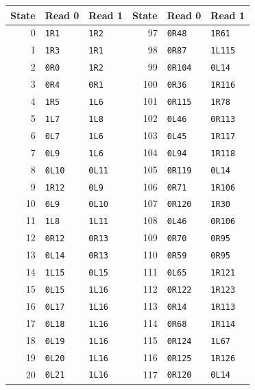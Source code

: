 \begingroup\small\setlength{\tabcolsep}{15pt}
\begin{longtable}{@{}rll@{\qquad\qquad}rll@{}}
\toprule State & Read 0 & Read 1 & State & Read 0 & Read 1\\\midrule\endhead
0 & \texttt{1R1} & \texttt{1R2} & 97 & \texttt{0R48} & \texttt{1R61}\\
1 & \texttt{1R3} & \texttt{1R1} & 98 & \texttt{0R87} & \texttt{1L115}\\
2 & \texttt{0R0} & \texttt{1R2} & 99 & \texttt{0R104} & \texttt{0L14}\\
3 & \texttt{0R4} & \texttt{0R1} & 100 & \texttt{0R36} & \texttt{1R116}\\
4 & \texttt{1R5} & \texttt{1L6} & 101 & \texttt{0R115} & \texttt{1R78}\\
5 & \texttt{1L7} & \texttt{1L8} & 102 & \texttt{0L46} & \texttt{0R113}\\
6 & \texttt{0L7} & \texttt{1L6} & 103 & \texttt{0L45} & \texttt{1R117}\\
7 & \texttt{0L9} & \texttt{1L6} & 104 & \texttt{0L94} & \texttt{1R118}\\
8 & \texttt{0L10} & \texttt{0L11} & 105 & \texttt{0R119} & \texttt{0L14}\\
9 & \texttt{1R12} & \texttt{0L9} & 106 & \texttt{0R71} & \texttt{1R106}\\
10 & \texttt{0L9} & \texttt{0L10} & 107 & \texttt{0R120} & \texttt{1R30}\\
11 & \texttt{1L8} & \texttt{1L11} & 108 & \texttt{0L46} & \texttt{0R106}\\
12 & \texttt{0R12} & \texttt{0R13} & 109 & \texttt{0R70} & \texttt{0R95}\\
13 & \texttt{0L14} & \texttt{0R13} & 110 & \texttt{0R59} & \texttt{0R95}\\
14 & \texttt{1L15} & \texttt{0L15} & 111 & \texttt{0L65} & \texttt{1R121}\\
15 & \texttt{0L15} & \texttt{1L16} & 112 & \texttt{0R122} & \texttt{1R123}\\
16 & \texttt{0L17} & \texttt{1L16} & 113 & \texttt{0R14} & \texttt{1R113}\\
17 & \texttt{0L18} & \texttt{1L16} & 114 & \texttt{0R68} & \texttt{1R114}\\
18 & \texttt{0L19} & \texttt{1L16} & 115 & \texttt{0R124} & \texttt{1L67}\\
19 & \texttt{0L20} & \texttt{1L16} & 116 & \texttt{0R125} & \texttt{1R126}\\
20 & \texttt{0L21} & \texttt{1L16} & 117 & \texttt{0R120} & \texttt{0L14}\\

\end{longtable}
